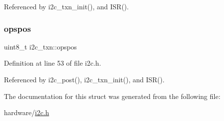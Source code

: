 Referenced by i2c\+\_\+txn\+\_\+init(), and I\+S\+R().

\mbox{\label{structi2c__txn_ac69407fdd93fd5d96075b8ebf77ecbca}} 
\subsubsection{\texorpdfstring{opspos}{opspos}}
{\footnotesize\ttfamily uint8\+\_\+t i2c\+\_\+txn\+::opspos}



Definition at line 53 of file i2c.\+h.



Referenced by i2c\+\_\+post(), i2c\+\_\+txn\+\_\+init(), and I\+S\+R().



The documentation for this struct was generated from the following file\+:\begin{DoxyCompactItemize}
\item 
hardware/\hyperlink{i2c_8h}{i2c.\+h}\end{DoxyCompactItemize}
